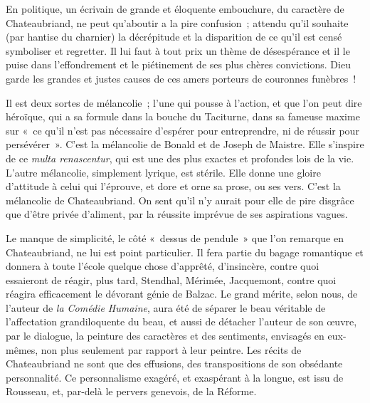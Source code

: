 \documentclass[french,twoside]{book} %
\begin{document}
En politique, un écrivain de grande et éloquente embouchure, du caractère de Chateaubriand, ne peut qu’aboutir a la pire confusion ; attendu qu’il souhaite (par hantise du charnier) la décrépitude et la disparition de ce qu’il est censé symboliser et regretter. Il lui faut à tout prix un thème de désespérance et il le puise dans l’effondrement et le piétinement de ses plus chères convictions. Dieu garde les grandes et justes causes de ces amers porteurs de couronnes funèbres !\par
Il est deux sortes de mélancolie ; l’une qui pousse à l’action, et que l’on peut dire héroïque, qui a sa formule dans la bouche du Taciturne, dans sa fameuse maxime sur « ce qu’il n’est pas nécessaire d’espérer pour entreprendre, ni de réussir pour persévérer ». C’est la mélancolie de Bonald et de Joseph de Maistre. Elle s’inspire de ce {\itshape multa renascentur}, qui est une des plus exactes et profondes lois de la vie. L’autre mélancolie, simplement lyrique, est stérile. Elle donne une gloire d’attitude à celui qui l’éprouve, et dore et orne sa prose, ou ses vers. C’est la mélancolie de Chateaubriand. On sent qu’il n’y aurait pour elle de pire disgrâce que d’être privée d’aliment, par la réussite imprévue de ses aspirations vagues.\par
Le manque de simplicité, le côté « dessus de pendule » que l’on remarque en Chateaubriand, ne lui est point particulier. Il fera partie du bagage romantique et donnera à toute l’école quelque chose d’apprêté, d’insincère, contre quoi essaieront de réagir, plus tard, Stendhal, Mérimée, Jacquemont, contre quoi réagira efficacement le dévorant génie de Balzac. Le grand mérite, selon nous, de l’auteur de {\itshape la Comédie Humaine}, aura été de séparer le beau véritable de l’affectation grandiloquente du beau, et aussi de détacher l’auteur de son œuvre, par le dialogue, la peinture des caractères et des sentiments, envisagés en eux-mêmes, non plus seulement par rapport à leur peintre. Les récits de Chateaubriand ne sont que des effusions, des transpositions de son obsédante personnalité. Ce personnalisme exagéré, et exaspérant à la longue, est issu de Rousseau, et, par-delà le pervers genevois, de la Réforme.\par
\end{document}
